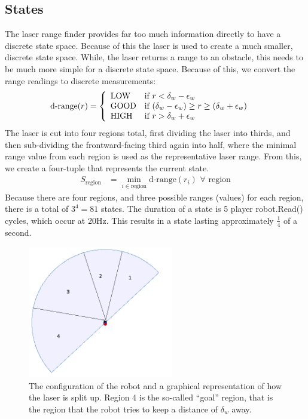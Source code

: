 \documentclass[letterpaper, 10 pt, conference]{ieeeconf}  %
\begin{document}
\subsection{States}
The laser range finder provides far too much information directly to have a discrete state space. 
Because of this the laser is used to create a much smaller, discrete state space. 
While, the laser returns a range to an obstacle, this needs to be much more simple for a discrete state space.
Because of this, we convert the range readings to discrete measurements: 
\begin{align}
\text{d-range}(r) &= \left\{ \begin{array}{ll} 
\text{LOW} & \mbox{if $r < \delta_w - \epsilon_w$} \\
\text{GOOD} & \mbox{if $ (\delta_w -\epsilon_w) \geq r \geq (\delta_w + \epsilon_w)$} \\
\text{HIGH} & \mbox{if $r > \delta_w + \epsilon_w$} \\
\end{array} \right.
\end{align}
The laser is cut into four regions total, first dividing the laser into thirds, and then sub-dividing the frontward-facing third again into half, where the minimal range value from each region is used as the representative laser range. 
From this, we create a four-tuple that represents the current state.
\begin{align}  
S_{\text{region}} &= \min_{i \in \text{region}} \text{d-range}(r_i) \, \, \forall \text{ region}
\end{align}
Because there are four regions, and three possible ranges (values) for each region, there is a total of $3^{4} = 81$ states.
The duration of a state is 5 player robot.Read() cycles, which occur at 20Hz.
This results in a state lasting approximately $\frac{1}{4}$ of a second. 

\begin{figure}
\centering
\includegraphics[width=2.5in]{statespace.png}
\caption{The configuration of the robot and a graphical representation of how the laser is split up. 
Region 4 is the so-called ``goal'' region, that is the region that the robot tries to keep a distance of $\delta_w$ away.}
\label{fig:statespace}
\end{figure}
\end{document}
